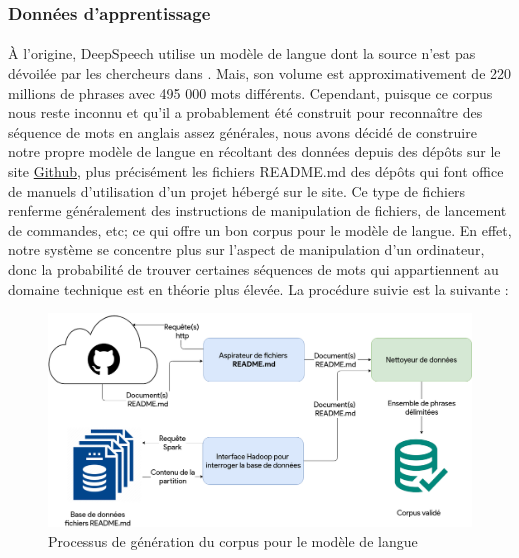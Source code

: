 		\subsubsection*{Données d'apprentissage}
		\paragraph{}
		À l'origine, DeepSpeech utilise un modèle de langue dont la source n'est pas dévoilée par les chercheurs dans \citep{deepspeech_paper}. Mais, son volume est approximativement de 220 millions de phrases avec 495 000 mots différents. Cependant, puisque ce corpus nous reste inconnu et qu'il a probablement été construit pour reconnaître des séquence de mots en anglais assez générales, nous avons décidé de construire notre propre modèle de langue en récoltant des données depuis des dépôts sur le site \href{https://github.com/}{Github}, plus précisément les fichiers README.md des dépôts qui font office de manuels d'utilisation d'un projet hébergé sur le site. Ce type de fichiers renferme généralement des instructions de manipulation de fichiers, de lancement de commandes, etc; ce qui offre un bon corpus pour le modèle de langue. En effet, notre système se concentre plus sur l'aspect de manipulation d'un ordinateur, donc la probabilité de trouver certaines séquences de mots qui appartiennent au domaine technique	 est en théorie plus élevée. La procédure suivie est la suivante : 
		\begin{figure}[H] 
			\label{fig:lm_gathering}
			\centering
			\includegraphics[width=0.88\linewidth]{images/Conception/ASR/lm_gathering.png}
			\caption{Processus de génération du corpus pour le modèle de langue}
		\end{figure}
